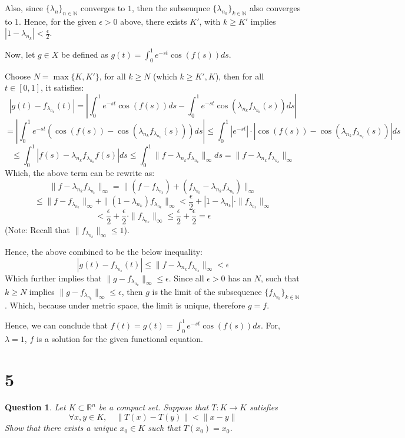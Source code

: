 \documentclass{article}
\newtheorem{question}{Question}
\begin{document}
Also, since $\{\lambda_n\}_{n\in\mathbb{N}}$ converges to $1$, then the subseuqnce $\{\lambda_{n_k}\}_{k\in\mathbb{N}}$ also converges to $1$. Hence, for the given $\epsilon>0$ above, there exists $K'$,
with $k\geq K'$ implies $|1-\lambda_{n_k}|<\frac{\epsilon}{2}$.

Now, let $g\in X$ be defined as $g(t)=\int_{0}^{1}e^{-st}\cos(f(s))ds$. 

Choose $N=\max\{K,K'\}$, for all $k\geq N$ (which $k\geq K',K$), then for all $t\in [0,1]$, it satisfies:
$$|g(t)-f_{\lambda_{n_k}}(t)| = \left|\int_{0}^{1}e^{-st}\cos(f(s))ds - \int_{0}^{1}e^{-st}\cos(\lambda_{n_k}f_{\lambda_{n_k}}(s))ds\right|$$
$$= \left|\int_{0}^{1}e^{-st}(\cos(f(s))-\cos(\lambda_{n_k}f_{\lambda_{n_k}}(s)))ds\right|\leq \int_{0}^{1}|e^{-st}|\cdot |\cos(f(s))-\cos(\lambda_{n_k}f_{\lambda_{n_k}}(s))|ds$$
$$\leq \int_{0}^{1}|f(s)-\lambda_{n_k}f_{\lambda_{n_k}}f(s)|ds \leq \int_{0}^{1}\|f-\lambda_{n_k}f_{\lambda_{n_k}}\|_\infty ds = \|f-\lambda_{n_k}f_{\lambda_{n_k}}\|_\infty$$
Which, the above term can be rewrite as:
$$\|f-\lambda_{n_k}f_{\lambda_{n_k}}\|_\infty = \|(f-f_{\lambda_{n_k}})+(f_{\lambda_{n_k}}-\lambda_{n_k}f_{\lambda_{n_k}})\|_\infty$$
$$\leq \|f-f_{\lambda_{n_k}}\|_\infty +\|(1-\lambda_{n_k})f_{\lambda_{n_k}}\|_\infty < \frac{\epsilon}{2}+|1-\lambda_{n_k}|\cdot \|f_{\lambda_{n_k}}\|_\infty$$
$$ < \frac{\epsilon}{2} + \frac{\epsilon}{2}\cdot \|f_{\lambda_{n_k}}\|_\infty \leq \frac{\epsilon}{2}+\frac{\epsilon}{2}=\epsilon$$
(Note: Recall that $\|f_{\lambda_{n_k}}\|_\infty \leq 1$).

Hence, the above combined to be the below inequality:
$$|g(t)-f_{\lambda_{n_k}}(t)| \leq \|f-\lambda_{n_k}f_{\lambda_{n_k}}\|_\infty < \epsilon$$
Which further implies that $\|g-f_{\lambda_{n_k}}\|_\infty \leq \epsilon$. Since all $\epsilon>0$ has an $N$, such that $k\geq N$ implies $\|g-f_{\lambda_{n_k}}\|_\infty \leq \epsilon$,
then $g$ is the limit of the subsequence $\{f_{\lambda_{n_k}}\}_{k\in\mathbb{N}}$. Which, because under metric space, the limit is unique, therefore $g=f$.

Hence, we can conclude that $f(t)=g(t)=\int_{0}^{1}e^{-st}\cos(f(s))ds$. For, $\lambda=1$, $f$ is a solution for the given functional equation.

\hfil

\hfil

\section*{5}
\begin{myBox}[]{}
    \begin{question}
        Let $K\subset \mathbb{R}^n$ be a compact set. Suppose that $T:K\rightarrow K$ satisfies
        $$\forall x,y\in K,\quad \|T(x)-T(y)\|<\|x-y\|$$
        Show that there exists a unique $x_0\in K$ such that $T(x_0)=x_0$.
    \end{question}
\end{myBox}
\end{document}
